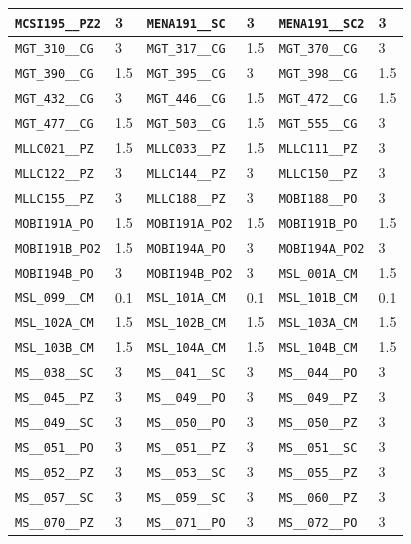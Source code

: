 \begin{longtable}{|l|l||l|l||l|l|}
    \verb|MCSI195__PZ2| & 3 & \verb|MENA191__SC| & 3 & \verb|MENA191__SC2| & 3\\\hline
    \verb|MGT_310__CG| & 3 & \verb|MGT_317__CG| & 1.5 & \verb|MGT_370__CG| & 3\\\hline
    \verb|MGT_390__CG| & 1.5 & \verb|MGT_395__CG| & 3 & \verb|MGT_398__CG| & 1.5\\\hline
    \verb|MGT_432__CG| & 3 & \verb|MGT_446__CG| & 1.5 & \verb|MGT_472__CG| & 1.5\\\hline
    \verb|MGT_477__CG| & 1.5 & \verb|MGT_503__CG| & 1.5 & \verb|MGT_555__CG| & 3\\\hline
    \verb|MLLC021__PZ| & 1.5 & \verb|MLLC033__PZ| & 1.5 & \verb|MLLC111__PZ| & 3\\\hline
    \verb|MLLC122__PZ| & 3 & \verb|MLLC144__PZ| & 3 & \verb|MLLC150__PZ| & 3\\\hline
    \verb|MLLC155__PZ| & 3 & \verb|MLLC188__PZ| & 3 & \verb|MOBI188__PO| & 3\\\hline
    \verb|MOBI191A_PO| & 1.5 & \verb|MOBI191A_PO2| & 1.5 & \verb|MOBI191B_PO| & 1.5\\\hline
    \verb|MOBI191B_PO2| & 1.5 & \verb|MOBI194A_PO| & 3 & \verb|MOBI194A_PO2| & 3\\\hline
    \verb|MOBI194B_PO| & 3 & \verb|MOBI194B_PO2| & 3 & \verb|MSL_001A_CM| & 1.5\\\hline
    \verb|MSL_099__CM| & 0.1 & \verb|MSL_101A_CM| & 0.1 & \verb|MSL_101B_CM| & 0.1\\\hline
    \verb|MSL_102A_CM| & 1.5 & \verb|MSL_102B_CM| & 1.5 & \verb|MSL_103A_CM| & 1.5\\\hline
    \verb|MSL_103B_CM| & 1.5 & \verb|MSL_104A_CM| & 1.5 & \verb|MSL_104B_CM| & 1.5\\\hline
    \verb|MS__038__SC| & 3 & \verb|MS__041__SC| & 3 & \verb|MS__044__PO| & 3\\\hline
    \verb|MS__045__PZ| & 3 & \verb|MS__049__PO| & 3 & \verb|MS__049__PZ| & 3\\\hline
    \verb|MS__049__SC| & 3 & \verb|MS__050__PO| & 3 & \verb|MS__050__PZ| & 3\\\hline
    \verb|MS__051__PO| & 3 & \verb|MS__051__PZ| & 3 & \verb|MS__051__SC| & 3\\\hline
    \verb|MS__052__PZ| & 3 & \verb|MS__053__SC| & 3 & \verb|MS__055__PZ| & 3\\\hline
    \verb|MS__057__SC| & 3 & \verb|MS__059__SC| & 3 & \verb|MS__060__PZ| & 3\\\hline
    \verb|MS__070__PZ| & 3 & \verb|MS__071__PO| & 3 & \verb|MS__072__PO| & 3\\\hline

\end{longtable}
